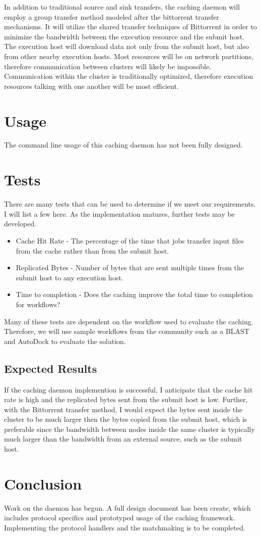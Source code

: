 In addition to traditional source and sink transfers, the caching daemon will employ a group transfer method modeled after the bittorrent \cite{cohen2008bittorrent} transfer mechanisms.  It will utilize the shared transfer techniques of Bittorrent in order to minimize the bandwidth between the execution resource and the submit host.  The execution host will download data not only from the submit host, but also from other nearby execution hosts.  Most resources will be on network partitions, therefore communication between clusters will likely be impossible.  Communication within the cluster is traditionally optimized, therefore execution resources talking with one another will be most efficient.

\section{Usage}
The command line usage of this caching daemon has not been fully designed.

\section{Tests}

There are many tests that can be used to determine if we meet our requirements.  I will list a few here.  As the implementation matures, further tests may be developed.

\begin{itemize}
\item Cache Hit Rate - The percentage of the time that jobs transfer input files from the cache rather than from the submit host.
\item Replicated Bytes - Number of bytes that are sent multiple times from the submit host to any execution host.
\item Time to completion - Does the caching improve the total time to completion for workflows?

\end{itemize}

Many of these tests are dependent on the workflow used to evaluate the caching.  Therefore, we will use sample workflows from the community such as a BLAST and AutoDock to evaluate the solution.

\subsection{Expected Results}

If the caching daemon implemention is successful, I anticipate that the cache hit rate is high and the replicated bytes sent from the submit host is low.  Further, with the Bittorrent transfer method, I would expect the bytes sent inside the cluster to be much larger then the bytes copied from the submit host, which is preferable since the bandwidth between nodes inside the same cluster is typically much larger than the bandwidth from an external source, such as the submit host.

\section{Conclusion}

Work on the daemon has begun.  A full design document has been create, which includes protocol specifics and prototyped usage of the caching framework.  Implementing the protocol handlers and the matchmaking is to be completed.




